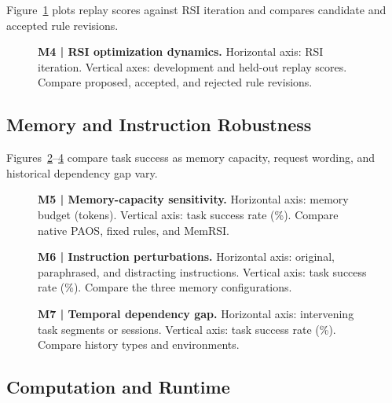 Figure~\ref{fig:M4_rsi_dynamics} plots replay scores
against RSI iteration and compares candidate
and accepted rule revisions.

\begin{figure}[t]
\centering
{}
\caption{\textbf{M4 | RSI optimization dynamics.}
Horizontal axis: RSI iteration. Vertical axes:
development and held-out replay scores.
Compare proposed, accepted, and rejected rule revisions.}
\label{fig:M4_rsi_dynamics}
\end{figure}

\subsection{Memory and Instruction Robustness}

Figures~\ref{fig:M5_memory_budget}--\ref{fig:M7_dependency_gap}
compare task success as memory capacity,
request wording, and historical dependency gap vary.

\begin{figure}[t]
\centering
{}
\caption{\textbf{M5 | Memory-capacity sensitivity.}
Horizontal axis: memory budget (tokens).
Vertical axis: task success rate (\%).
Compare native PAOS, fixed rules, and MemRSI.}
\label{fig:M5_memory_budget}
\end{figure}

\begin{figure}[t]
\centering
{}
\caption{\textbf{M6 | Instruction perturbations.}
Horizontal axis: original, paraphrased, and distracting
instructions. Vertical axis: task success rate (\%).
Compare the three memory configurations.}
\label{fig:M6_perturbation}
\end{figure}

\begin{figure}[t]
\centering
{}
\caption{\textbf{M7 | Temporal dependency gap.}
Horizontal axis: intervening task segments or sessions.
Vertical axis: task success rate (\%).
Compare history types and environments.}
\label{fig:M7_dependency_gap}
\end{figure}

\subsection{Computation and Runtime}

